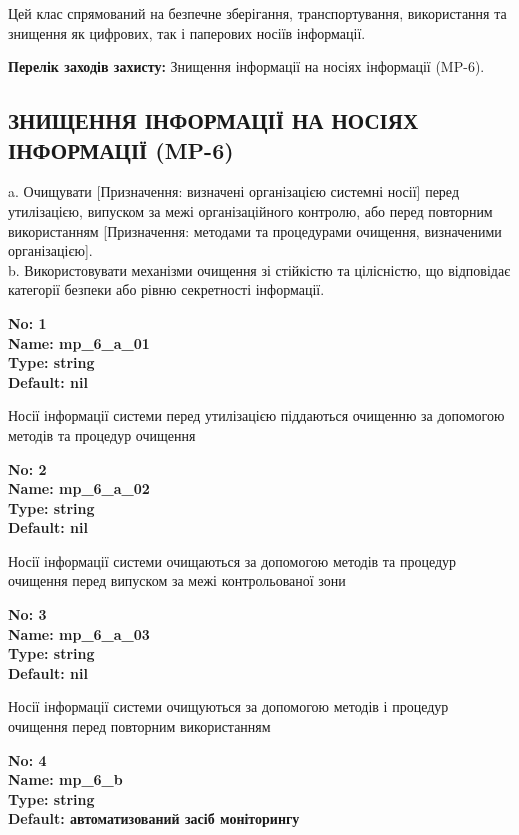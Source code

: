 \documentclass{article}
\begin{document}
Цей клас спрямований на безпечне зберігання, транспортування, використання та знищення як цифрових, так і паперових носіїв інформації.

\textbf{Перелік заходів захисту:} Знищення інформації на носіях інформації (MP-6).

\subsection{ЗНИЩЕННЯ ІНФОРМАЦІЇ НА НОСІЯХ ІНФОРМАЦІЇ (MP-6)}
a. Очищувати [Призначення: визначені організацією системні носії] перед утилізацією, випуском за межі організаційного контролю, або перед повторним використанням [Призначення: методами та процедурами очищення, визначеними організацією].\\ 
b. Використовувати механізми очищення зі стійкістю та цілісністю, що відповідає категорії безпеки або рівню секретності інформації.

\vspace{10pt}
{\footnotesize\bfseries
No: 1\\
Name: mp\_\allowbreak{}6\_\allowbreak{}a\_\allowbreak{}01\\
Type: string\\
Default: nil
}

{\footnotesize Носії інформації системи перед утилізацією піддаються очищенню за допомогою методів та процедур очищення}


{\footnotesize\bfseries
No: 2\\
Name: mp\_\allowbreak{}6\_\allowbreak{}a\_\allowbreak{}02\\
Type: string\\
Default: nil
}

{\footnotesize Носії інформації системи очищаються за допомогою методів та процедур очищення перед випуском за межі контрольованої зони}


{\footnotesize\bfseries
No: 3\\
Name: mp\_\allowbreak{}6\_\allowbreak{}a\_\allowbreak{}03\\
Type: string\\
Default: nil
}

{\footnotesize Носії інформації системи очищуються за допомогою методів і процедур очищення перед повторним використанням}


{\footnotesize\bfseries
No: 4\\
Name: mp\_\allowbreak{}6\_\allowbreak{}b\\
Type: string\\
Default: \textquotedbl{}автоматизований засіб моніторингу\textquotedbl{}
}
\end{document}
